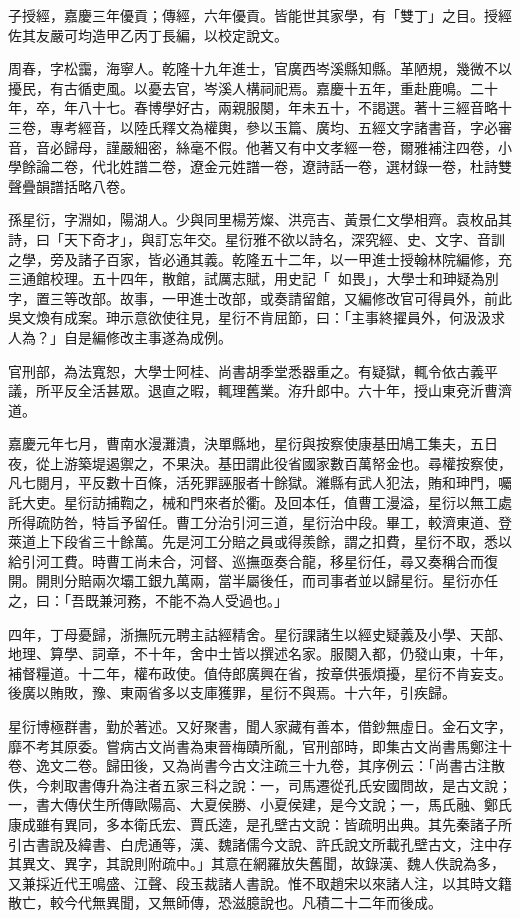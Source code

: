 \begin{pinyinscope}
子授經，嘉慶三年優貢；傳經，六年優貢。皆能世其家學，有「雙丁」之目。授經佐其友嚴可均造甲乙丙丁長編，以校定說文。

周春，字松靄，海寧人。乾隆十九年進士，官廣西岑溪縣知縣。革陋規，幾微不以擾民，有古循吏風。以憂去官，岑溪人構祠祀焉。嘉慶十五年，重赴鹿鳴。二十年，卒，年八十七。春博學好古，兩親服闋，年未五十，不謁選。著十三經音略十三卷，專考經音，以陸氏釋文為權輿，參以玉篇、廣均、五經文字諸書音，字必審音，音必歸母，謹嚴細密，絲毫不假。他著又有中文孝經一卷，爾雅補注四卷，小學餘論二卷，代北姓譜二卷，遼金元姓譜一卷，遼詩話一卷，選材錄一卷，杜詩雙聲疊韻譜括略八卷。

孫星衍，字淵如，陽湖人。少與同里楊芳燦、洪亮吉、黃景仁文學相齊。袁枚品其詩，曰「天下奇才」，與訂忘年交。星衍雅不欲以詩名，深究經、史、文字、音訓之學，旁及諸子百家，皆必通其義。乾隆五十二年，以一甲進士授翰林院編修，充三通館校理。五十四年，散館，試厲志賦，用史記「如畏」，大學士和珅疑為別字，置三等改部。故事，一甲進士改部，或奏請留館，又編修改官可得員外，前此吳文煥有成案。珅示意欲使往見，星衍不肯屈節，曰：「主事終擢員外，何汲汲求人為？」自是編修改主事遂為成例。

官刑部，為法寬恕，大學士阿桂、尚書胡季堂悉器重之。有疑獄，輒令依古義平議，所平反全活甚眾。退直之暇，輒理舊業。洊升郎中。六十年，授山東兗沂曹濟道。

嘉慶元年七月，曹南水漫灘潰，決單縣地，星衍與按察使康基田鳩工集夫，五日夜，從上游築堤遏禦之，不果決。基田謂此役省國家數百萬帑金也。尋權按察使，凡七閱月，平反數十百條，活死罪誣服者十餘獄。濰縣有武人犯法，賄和珅門，囑託大吏。星衍訪捕鞫之，械和門來者於衢。及回本任，值曹工漫溢，星衍以無工處所得疏防咎，特旨予留任。曹工分治引河三道，星衍治中段。畢工，較濟東道、登萊道上下段省三十餘萬。先是河工分賠之員或得羨餘，謂之扣費，星衍不取，悉以給引河工費。時曹工尚未合，河督、巡撫亟奏合龍，移星衍任，尋又奏稱合而復開。開則分賠兩次壩工銀九萬兩，當半屬後任，而司事者並以歸星衍。星衍亦任之，曰：「吾既兼河務，不能不為人受過也。」

四年，丁母憂歸，浙撫阮元聘主詁經精舍。星衍課諸生以經史疑義及小學、天部、地理、算學、詞章，不十年，舍中士皆以撰述名家。服闋入都，仍發山東，十年，補督糧道。十二年，權布政使。值侍郎廣興在省，按章供張煩擾，星衍不肯妄支。後廣以賄敗，豫、東兩省多以支庫獲罪，星衍不與焉。十六年，引疾歸。

星衍博極群書，勤於著述。又好聚書，聞人家藏有善本，借鈔無虛日。金石文字，靡不考其原委。嘗病古文尚書為東晉梅賾所亂，官刑部時，即集古文尚書馬鄭注十卷、逸文二卷。歸田後，又為尚書今古文注疏三十九卷，其序例云：「尚書古注散佚，今刺取書傳升為注者五家三科之說：一，司馬遷從孔氏安國問故，是古文說；一，書大傳伏生所傳歐陽高、大夏侯勝、小夏侯建，是今文說；一，馬氏融、鄭氏康成雖有異同，多本衛氏宏、賈氏逵，是孔壁古文說：皆疏明出典。其先秦諸子所引古書說及緯書、白虎通等，漢、魏諸儒今文說、許氏說文所載孔壁古文，注中存其異文、異字，其說則附疏中。」其意在網羅放失舊聞，故錄漢、魏人佚說為多，又兼採近代王鳴盛、江聲、段玉裁諸人書說。惟不取趙宋以來諸人注，以其時文籍散亡，較今代無異聞，又無師傳，恐滋臆說也。凡積二十二年而後成。


\end{pinyinscope}
